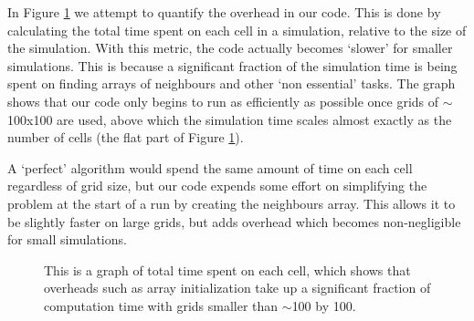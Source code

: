 	 In Figure \ref{overhead} we attempt to quantify the overhead in our code. This is done by calculating the total time spent on each cell in a 
	 simulation, relative to the size of the simulation. With this metric, the code actually becomes `slower' for smaller simulations. This is 
	 because a significant fraction of the simulation time is being spent on finding arrays of neighbours and other `non essential' tasks. The graph
	 shows that our code only begins to run as efficiently as possible once grids of $\sim$100x100 are used, above which the simulation time scales
	 almost exactly as the number of cells (the flat part of Figure \ref{overhead}).\newline{}
	 
	 A `perfect' algorithm would spend the same amount of time on each cell regardless of grid size, but our code expends some effort on simplifying the problem 
	 at the start of a run by creating the neighbours array. This allows it to be slightly faster on large grids, but adds overhead which becomes non-negligible 
	 for small simulations.\newline{}
	 
  \begin{figure}[h]
  \begin{center}
  
  \caption{\label{overhead}This is a graph of total time spent on each cell, which shows that overheads such as array initialization
  take up a significant fraction of computation time with grids smaller than $\sim$100 by 100.}
  \end{center}
  \end{figure}
  
